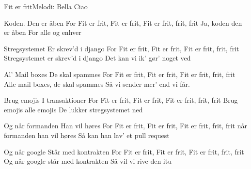 \begin{sang}{Fit er frit}{Melodi: Bella Ciao}
\begin{vers}
Koden.
Den er åben
For Fit er frit, Fit er frit, Fit er frit, frit, frit
Ja, koden den er åben
For alle og enhver 
\end{vers}
\begin{vers}
Stregsystemet
Er skrev’d i django
For Fit er frit, Fit er frit, Fit er frit, frit, frit
Stregsystemet er skrev’d i django
Det kan vi ik’ gør’ noget ved 
\end{vers}
\begin{vers}
Al’ Mail boxes
De skal spammes
For Fit er frit, Fit er frit, Fit er frit, frit, frit
Alle mail boxes, de skal spammes
Så vi sender mer’ end vi får.
\end{vers}
\begin{vers}
Brug emojis
I transaktioner
For Fit er frit, Fit er frit, Fit er frit, frit, frit
Brug emojis alle emojis
De lukker stregsystemet ned 
\end{vers}
\begin{vers}
Og når formanden
Han vil høres
For Fit er frit, Fit er frit, Fit er frit, frit, frit
når formanden han vil høres
Så kan han lav’ et pull request 
\end{vers}
\begin{vers}
 Og når google
Står med kontrakten
For Fit er frit, Fit er frit, Fit er frit, frit, frit
Og når google står med kontrakten
Så vil vi rive den itu 
\end{vers}
\end{sang}
